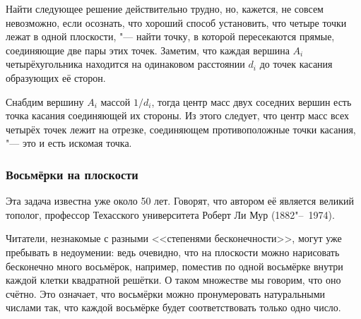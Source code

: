 \documentclass[twoside]{book}
\makeatletter
\newcommand{\rindex}[2][\imki@jobname]{%
\index[#1]{\detokenize{#2}}%
}
\makeatother
\begin{document}
\medskip

Найти следующее решение действительно трудно, но, кажется, не совсем
невозможно, если осознать, что хороший способ установить, что четыре
точки лежат в одной плоскости, "--- найти точку, в которой
пересекаются прямые, соединяющие две пары этих точек.
Заметим, что
каждая вершина $A_i$ четырёхугольника находится на одинаковом
расстоянии $d_i$ до точек касания образующих её сторон.

Снабдим вершину $A_i$ массой $1/d_i$, тогда центр масс двух соседних
вершин есть точка касания соединяющей их стороны.
Из этого следует,
что центр масс всех четырёх точек лежит на отрезке, соединяющем
противоположные точки касания, "--- это и есть искомая точка. \heart











\subsubsection*{Восьмёрки на плоскости}%

Эта задача известна уже около 50 лет.
Говорят, что автором её
является великий тополог, профессор Техасского университета Роберт Ли
Мур (1882"--~1974).

Читатели, незнакомые с разными <<степенями бесконечности>>, могут уже пребывать в недоумении: ведь очевидно, что на плоскости можно нарисовать бесконечно много восьмёрок, например, поместив по одной восьмёрке внутри каждой клетки квадратной решётки.
О таком множестве мы говорим, что оно счётно. 
Это означает, что восьмёрки можно пронумеровать натуральными числами так, что каждой восьмёрке будет соответствовать только одно число.
\end{document}
